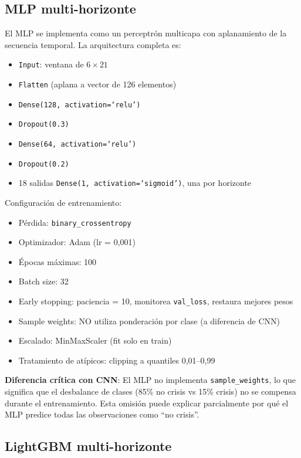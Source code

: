 \subsection{MLP multi-horizonte}

El MLP se implementa como un perceptrón multicapa con aplanamiento de la secuencia temporal. La arquitectura completa es:

\begin{itemize}
    \item \texttt{Input}: ventana de $6 \times 21$
    \item \texttt{Flatten} (aplana a vector de 126 elementos)
    \item \texttt{Dense(128, activation=`relu')}
    \item \texttt{Dropout(0.3)}
    \item \texttt{Dense(64, activation=`relu')}
    \item \texttt{Dropout(0.2)}
    \item 18 salidas \texttt{Dense(1, activation=`sigmoid')}, una por horizonte
\end{itemize}

Configuración de entrenamiento:
\begin{itemize}
    \item Pérdida: \texttt{binary\_crossentropy}
    \item Optimizador: Adam (lr = 0,001)
    \item Épocas máximas: 100
    \item Batch size: 32
    \item Early stopping: paciencia = 10, monitorea \texttt{val\_loss}, restaura mejores pesos
    \item Sample weights: NO utiliza ponderación por clase (a diferencia de CNN)
    \item Escalado: MinMaxScaler (fit solo en train)
    \item Tratamiento de atípicos: clipping a quantiles 0,01--0,99
\end{itemize}

\textbf{Diferencia crítica con CNN}: El MLP no implementa \texttt{sample\_weights}, lo que significa que el desbalance de clases (85\% no crisis vs 15\% crisis) no se compensa durante el entrenamiento. Esta omisión puede explicar parcialmente por qué el MLP predice todas las observaciones como ``no crisis''.

\subsection{LightGBM multi-horizonte}


